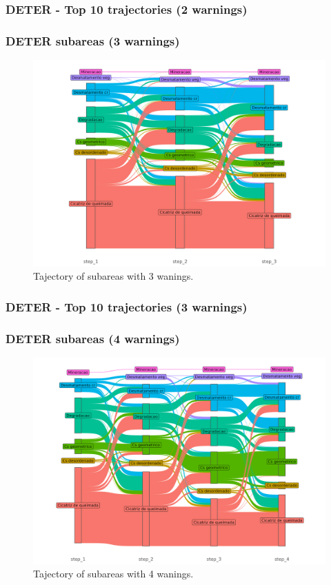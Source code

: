 \documentclass[aspectratio=169]{beamer}
\begin{document}
\begin{frame}[allowframebreaks]
    \frametitle{DETER - Top 10 trajectories (2 warnings)}
    
\end{frame}

\begin{frame}
    \frametitle{DETER subareas (3 warnings)}
    \begin{figure}[h] 
        \includegraphics[width=0.65\linewidth]
        {./figures/plot_deter_subarea_trajectory_3.png}
        \caption{Tajectory of subareas with 3 wanings.}
        \label{fig:deter_subarea_trajectory_3}
    \end{figure}
\end{frame}

\begin{frame}[allowframebreaks]
    \frametitle{DETER - Top 10 trajectories (3 warnings)}
    
\end{frame}

\begin{frame}
    \frametitle{DETER subareas (4 warnings)}
    \begin{figure}[h] 
        \includegraphics[width=0.65\linewidth]
        {./figures/plot_deter_subarea_trajectory_4.png}
        \caption{Tajectory of subareas with 4 wanings.}
        \label{fig:deter_subarea_trajectory_4}
    \end{figure}
\end{frame}
\end{document}
